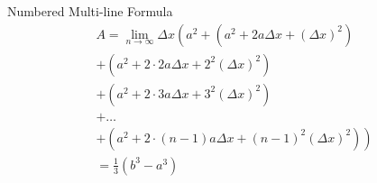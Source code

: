 \begin{frame}
    \begin{exampleblock}{Numbered Multi-line Formula}
        \begin{multline}
            A=\lim_{n\rightarrow\infty}\Delta x\left(a^{2}+\left(a^{2}+2a\Delta x+\left(\Delta x\right)^{2}\right)\right.\label{eq:reset}\\
            +\left(a^{2}+2\cdot2a\Delta x+2^{2}\left(\Delta x\right)^{2}\right)\\
            +\left(a^{2}+2\cdot3a\Delta x+3^{2}\left(\Delta x\right)^{2}\right)\\
            +\ldots\\
            \left.+\left(a^{2}+2\cdot(n-1)a\Delta x+(n-1)^{2}\left(\Delta x\right)^{2}\right)\right)\\
            =\frac{1}{3}\left(b^{3}-a^{3}\right)
        \end{multline}
    \end{exampleblock}
\end{frame}

